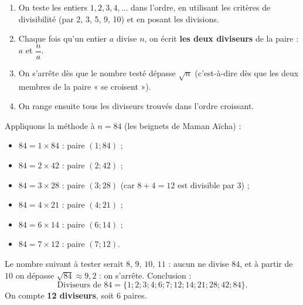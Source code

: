 \documentclass[11pt]{article}
\begin{document}
\begin{methode}
\begin{enumerate}
\item On teste les entiers $1, 2, 3, 4, \dots$ dans l'ordre, en utilisant les critères de divisibilité (par 2, 3, 5, 9, 10) et en posant les divisions.
\item Chaque fois qu'un entier $a$ divise $n$, on écrit \textbf{les deux diviseurs} de la paire : $a$ et $\dfrac{n}{a}$.
\item On s'arrête dès que le nombre testé dépasse $\sqrt{n}$ (c'est-à-dire dès que les deux membres de la paire « se croisent »).
\item On range ensuite tous les diviseurs trouvés dans l'ordre croissant.
\end{enumerate}
\end{methode}

\begin{exemplebox}
Appliquons la méthode à $n = 84$ (les beignets de Maman Aïcha) :
\begin{itemize}
\item $84 = 1 \times 84$ : paire $(1 ; 84)$ ;
\item $84 = 2 \times 42$ : paire $(2 ; 42)$ ;
\item $84 = 3 \times 28$ : paire $(3 ; 28)$ (car $8 + 4 = 12$ est divisible par 3) ;
\item $84 = 4 \times 21$ : paire $(4 ; 21)$ ;
\item $84 = 6 \times 14$ : paire $(6 ; 14)$ ;
\item $84 = 7 \times 12$ : paire $(7 ; 12)$.
\end{itemize}
Le nombre suivant à tester serait $8$, $9$, $10$, $11$ : aucun ne divise $84$, et à partir de $10$ on dépasse $\sqrt{84} \approx 9,2$ : on s'arrête. Conclusion :
\[ \text{Diviseurs de } 84 = \{1 ; 2 ; 3 ; 4 ; 6 ; 7 ; 12 ; 14 ; 21 ; 28 ; 42 ; 84\}. \]
On compte \textbf{12 diviseurs}, soit 6 paires.
\end{exemplebox}
\end{document}
